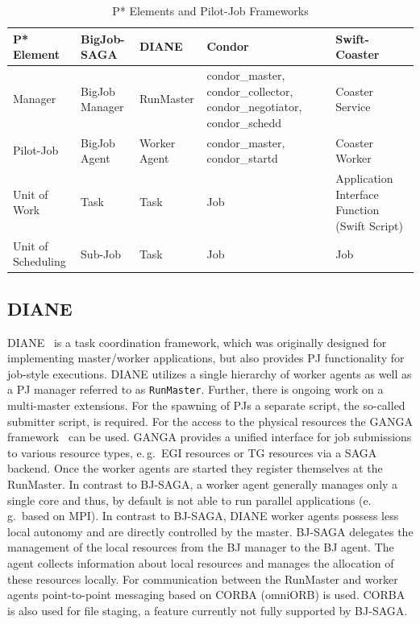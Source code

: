 \documentclass[conference,final]{IEEEtran}
\newcommand{\upp}{\vspace*{-0.5em}}
\begin{document}
\begin{table}[t]
\centering
\begin{tabular}{|p{2.5cm}|p{3cm}|p{3cm}|p{3cm}|p{3cm}|}
\hline
\textbf{P* Element} &\textbf{BigJob-SAGA} &\textbf{DIANE} &\textbf{Condor} 
&\textbf{Swift-Coaster}  \\
\hline
Manager &BigJob Manager & RunMaster & condor\_master, condor\_collector, condor\_negotiator, condor\_schedd &Coaster Service\\ 
\hline
Pilot-Job &BigJob Agent  & Worker Agent &condor\_master, condor\_startd &Coaster Worker\\
\hline
Unit of Work &Task &Task &Job &Application Interface Function (Swift Script)\\
\hline
Unit of Scheduling &Sub-Job &Task &Job &Job\\
\hline
\end{tabular}
\caption{P* Elements and Pilot-Job Frameworks} \label{table:bigjob-saga-diane}
\end{table}

\subsection{DIANE\upp\upp}

DIANE~\cite{Moscicki:908910} is a task coordination framework, which was
originally designed for implementing master/worker applications, but also
provides PJ functionality for job-style executions. DIANE utilizes a single
hierarchy of worker agents as well as a PJ manager referred to as
\texttt{RunMaster}. Further, there is ongoing work on a multi-master extensions.
For the spawning of PJs a separate script, the so-called submitter script, is
required. For the access to the physical resources the GANGA 
framework~\cite{DBLP:journals/corr/abs-0902-2685} can be used. GANGA
provides a unified interface for job submissions to various resource types,
e.\,g.\ EGI resources or TG resources via a SAGA backend. Once the worker agents
are started they register themselves at the RunMaster. In contrast to BJ-SAGA, a
worker agent generally manages only a single core and thus, by default is not
able to run parallel applications (e.\,g.\ based on MPI). In contrast to
BJ-SAGA, DIANE worker agents possess less local autonomy and are directly
controlled by the master. BJ-SAGA delegates the management of the local
resources from the BJ manager to the BJ agent. The agent collects information
about local resources and manages the allocation of these resources locally. For
communication between the RunMaster and worker agents point-to-point messaging
based on CORBA (omniORB) is used. CORBA is also used for file staging, a feature
currently not fully supported by BJ-SAGA.
\end{document}
